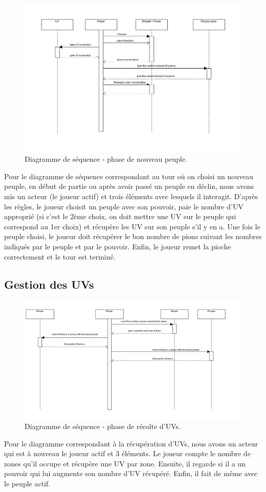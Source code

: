 \documentclass[11pt]{report}
\begin{document}
				\begin{figure}[!h]
\centering
\includegraphics[width=13cm]{NouveauPeuplesequence.png}
\caption{Diagramme de séquence - phase de nouveau peuple.}
\end{figure}
		Pour le diagramme de séquence correspondant au tour où on choisi un nouveau peuple, en début de partie ou après avoir passé un peuple en déclin, nous avons mis un acteur (le joueur actif) et trois éléments avec lesquels il interagit. D'après les règles, le joueur choisit un peuple avec son pouvoir, paie le nombre d'UV approprié (si c'est le 2ème choix, on doit mettre une UV sur le peuple qui correspond au 1er choix) et récupère les UV sur son peuple s'il y en a. Une fois le peuple choisi, le joueur doit récupérer le bon nombre de pions suivant les nombres indiqués par le peuple et par le pouvoir. Enfin, le joueur remet la pioche correctement et le tour est terminé.

		\subsection{Gestion des UVs}
				\begin{figure}[!h]
\centering
\includegraphics[width=13cm]{Pointssequence.png}
\caption{Diagramme de séquence - phase de récolte d'UVs.}
\end{figure}
		Pour le diagramme correspondant à la récupération d'UVs, nous avons un acteur qui est à nouveau le joueur actif et 3 éléments. Le joueur compte le nombre de zones qu'il occupe et récupère une UV par zone. Ensuite, il regarde si il a un pouvoir qui lui augmente son nombre d'UV récupéré. Enfin, il fait de même avec le peuple actif.
\end{document}

